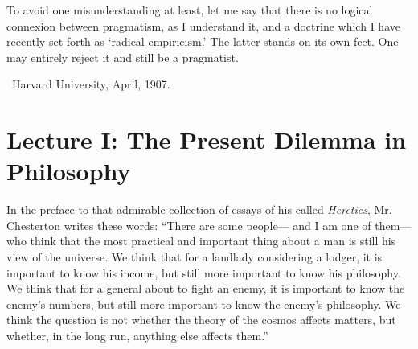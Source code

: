 \documentclass[]{article}
\begin{document}
\medskip



To avoid one misunderstanding at least, let me say that there is no logical connexion between pragmatism, as I understand it, and a doctrine
which I have recently set forth as `radical empiricism.' The latter
stands on its own feet. One may entirely reject it and still be a
pragmatist.

~\hfill Harvard University, April, 1907.


\section*{Lecture I: The Present Dilemma in Philosophy}

In the preface to that admirable collection of essays of his called
\emph{Heretics}, Mr. Chesterton writes these words: ``There are some
people--- and I am one of them--- who think that the most practical and
important thing about a man is still his view of the universe. We think
that for a landlady considering a lodger, it is important to know his
income, but still more important to know his philosophy. We think that
for a general about to fight an enemy, it is important to know
the enemy's numbers, but still more important to know the enemy's
philosophy. We think the question is not whether the theory of the
cosmos affects matters, but whether, in the long run, anything else
affects them.''
\end{document}
